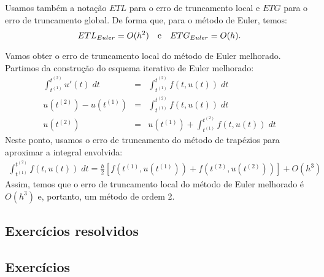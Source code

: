 Usamos também a notação $ETL$ para o erro de truncamento local e $ETG$ para o erro de truncamento global. De forma que, para o método de Euler, temos:
\begin{equation} ETL_{Euler} = O(h^2) ~~~ \hbox{e} ~~~ ETG_{Euler}=O(h). \end{equation}
\begin{ex} Vamos obter o erro de truncamento local do método de Euler melhorado.
Partimos da construção do esquema iterativo de Euler melhorado:
\begin{eqnarray}
  \int_{t^{(1)}}^{t^{(2)}} u'(t) \;dt &=& \int_{t^{(1)}}^{t^{(2)}} f(t,u(t)) \; dt\\
  u(t^{(2)})-u(t^{(1)})               &=& \int_{t^{(1)}}^{t^{(2)}} f(t,u(t)) \; dt\\
  u(t^{(2)})                      &=& u(t^{(1)}) +  \int _{t^{(1)}}^{t^{(2)}} f(t,u(t)) \; dt
\end{eqnarray}
Neste ponto, usamos o erro de truncamento do método de trapézios para aproximar a integral envolvida:
\begin{eqnarray}
\int _{t^{(1)}}^{t^{(2)}} f(t,u(t)) \; dt = \frac{h}{2}\left[f\left(t^{(1)},u(t^{(1)})\right) + f\left(t^{(2)},u(t^{(2)})\right)\right] + O(h^3)
\end{eqnarray}
Assim, temos que o erro de truncamento local do método de Euler melhorado é $O(h^3)$ e, portanto, um método de ordem 2.
\end{ex}

\subsection*{Exercícios resolvidos}

\construirExeresol

\subsection*{Exercícios}

\construirExer

